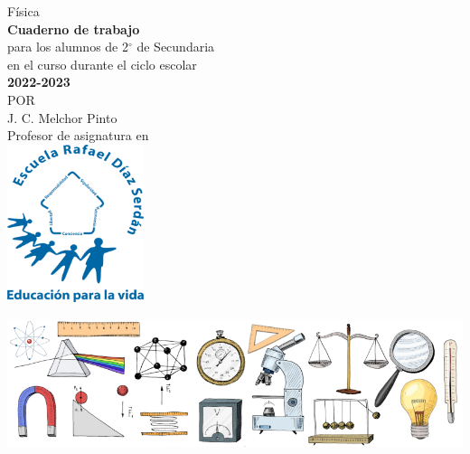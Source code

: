 \thispagestyle{empty}
\begin{center}
    \vspace{4cm}
    {\Huge Física}\\
    \vspace{1cm}
    \normalsize
    \textbf{\large Cuaderno de trabajo}\\
    para los alumnos de 2$^\circ$ de  Secundaria\\
    en el curso durante el ciclo escolar\\
    \textbf{2022-2023}\\
    \vspace{2cm}
    \small POR\\
    \Large J. C. Melchor Pinto\\[0.5em]
    \normalsize Profesor de asignatura en\\
    \vspace{2cm}
    \includegraphics[width=4cm]{../Images/LOGO_RDS_nobg}\\
    \vspace{1.8cm}
\end{center}
\includegraphics[width=1\textwidth]{../Images/cover_bg}